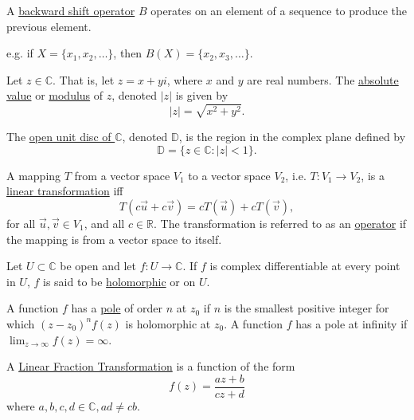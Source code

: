 \begin{defn}
A \underline{backward shift operator} $B$ operates on an element of a sequence to produce the previous element.

e.g. if $X = \{x_1, x_2, \dots\}$, then
$B(X) = \{x_2, x_3, \dots\}$.
\end{defn}

\begin{defn}
Let $z \in \mathbb{C}$.  That is, let $z = x + yi$, where $x$ and $y$ are real numbers.  The \underline{absolute value} or \underline{modulus} of $z$, denoted $|z|$ is given by \[|z| = \sqrt{x^2 + y^2}.\]
\end{defn}

\begin{defn}
The \underline{open unit disc of $\mathbb{C}$}, denoted $\mathbb{D}$, is the region in the complex plane defined by \[\mathbb{D} = \{z \in \mathbb{C} : |z| < 1\}.\]
\end{defn}

\begin{defn}
A mapping $T$ from a vector space $V_1$ to a vector space $V_2$, i.e. $T:V_1 \rightarrow V_2$, is a \underline{linear transformation} iff
\[T(c\vec{u} + c\vec{v}) = cT(\vec{u}) + cT(\vec{v}),\] for all $\vec{u}, \vec{v} \in V_1$, and all $c \in \mathbb{R}$.  The transformation is referred to as an \underline{operator} if the mapping is from a vector space to itself.
\end{defn}

\begin{defn}
Let $U \subset \mathbb{C}$ be open and let $f: U \rightarrow \mathbb{C}$.  If $f$ is complex differentiable at every point in $U$, $f$ is said to be \underline{holomorphic} or on $U$.
\end{defn}

\begin{defn}
A function $f$ has a \underline{pole} of order $n$ at $z_0$ if $n$ is the smallest positive integer for which $(z-z_0)^nf(z)$ is holomorphic at $z_0$.  A function $f$ has a pole at infinity if $\lim_{z\rightarrow \infty} f(z) = \infty$.
\end{defn}

\begin{defn}
A \underline{Linear Fraction Transformation} is a function of the form
\[f(z) = \frac{az + b}{cz + d}\]
where $a,b,c,d \in \mathbb{C}, ad \neq cb$.
\end{defn}

